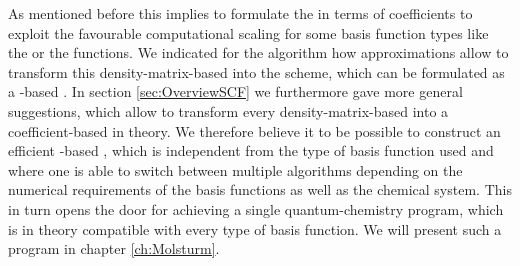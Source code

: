 As mentioned before this implies to formulate the \SCF in terms of coefficients
to exploit the favourable computational scaling
for some basis function types like the \FE or the \CS functions.
We indicated for the \ODA algorithm
how approximations allow to transform this density-matrix-based
\SCF into the \tODA scheme,
which can be formulated as a \contraction-based \SCF.
In section \vref{sec:OverviewSCF} we furthermore gave more general suggestions,
which allow to transform every density-matrix-based \SCF
into a coefficient-based \SCF in theory.
We therefore believe it to be possible
to construct an efficient \contraction-based \SCF,
which is independent from the type of basis function used
and where one is able to switch between
multiple algorithms depending on the numerical requirements of the basis functions
as well as the chemical system.
This in turn opens the door
for achieving a single quantum-chemistry program,
which is in theory compatible with every type of basis function.
We will present such a program in chapter \vref{ch:Molsturm}.
